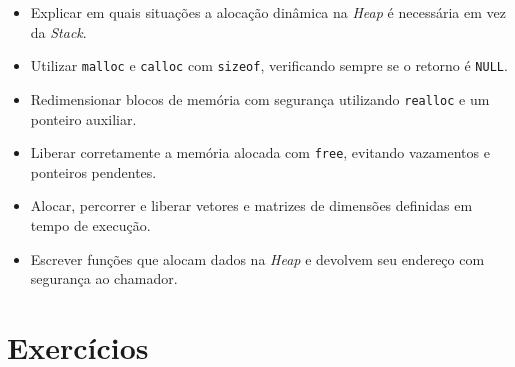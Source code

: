 \begin{objetivos}
\begin{itemize}
    \item Explicar em quais situações a alocação dinâmica na \textit{Heap} é necessária em vez da \textit{Stack}.
    \item Utilizar \texttt{malloc} e \texttt{calloc} com \texttt{sizeof}, verificando sempre se o retorno é \texttt{NULL}.
    \item Redimensionar blocos de memória com segurança utilizando \texttt{realloc} e um ponteiro auxiliar.
    \item Liberar corretamente a memória alocada com \texttt{free}, evitando vazamentos e ponteiros pendentes.
    \item Alocar, percorrer e liberar vetores e matrizes de dimensões definidas em tempo de execução.
    \item Escrever funções que alocam dados na \textit{Heap} e devolvem seu endereço com segurança ao chamador.
\end{itemize}
\end{objetivos}

\section*{Exercícios}

